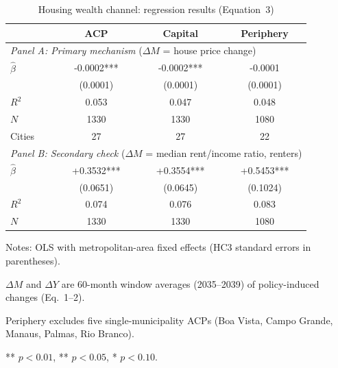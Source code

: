 \begin{table}[htbp]
\centering
\caption{Housing wealth channel: regression results (Equation~3)}
\label{tab:regression}
\begin{threeparttable}
\begin{tabular}{lccc}
\toprule
 & ACP & Capital & Periphery \\
\midrule
\multicolumn{4}{l}{\textit{Panel A: Primary mechanism} ($\Delta M$ = house price change)} \\[2pt]
$\hat{\beta}$ & -0.0002*** & -0.0002*** & -0.0001 \\
 & (0.0001) & (0.0001) & (0.0001) \\[4pt]
$R^2$ & 0.053 & 0.047 & 0.048 \\
$N$ & 1330 & 1330 & 1080 \\
Cities & 27 & 27 & 22 \\
\midrule
\multicolumn{4}{l}{\textit{Panel B: Secondary check} ($\Delta M$ = median rent/income ratio, renters)} \\[2pt]
$\hat{\beta}$ & +0.3532*** & +0.3554*** & +0.5453*** \\
 & (0.0651) & (0.0645) & (0.1024) \\[4pt]
$R^2$ & 0.074 & 0.076 & 0.083 \\
$N$ & 1330 & 1330 & 1080 \\
\bottomrule
\end{tabular}
\begin{tablenotes}
\footnotesize
\item Notes: OLS with metropolitan-area fixed effects (HC3 standard errors in parentheses).
\item $\Delta M$ and $\Delta Y$ are 60-month window averages (2035--2039) of policy-induced changes (Eq.~1--2).
\item Periphery excludes five single-municipality ACPs (Boa Vista, Campo Grande, Manaus, Palmas, Rio Branco).
\item *** $p<0.01$, ** $p<0.05$, * $p<0.10$.
\end{tablenotes}
\end{threeparttable}
\end{table}